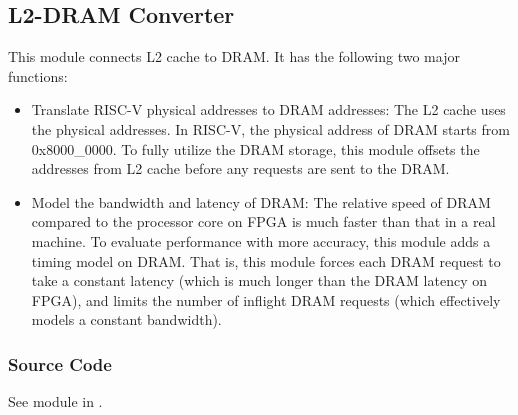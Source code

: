 \subsection{L2-DRAM Converter}

This module connects L2 cache to DRAM.
It has the following two major functions:
\begin{itemize}
    \item Translate RISC-V physical addresses to DRAM addresses:
    The L2 cache uses the physical addresses.
    In RISC-V, the physical address of DRAM starts from 0x8000\_0000.
    To fully utilize the DRAM storage, this module offsets the addresses from L2 cache before any requests are sent to the DRAM.
    
    \item Model the bandwidth and latency of DRAM:
    The relative speed of DRAM compared to the processor core on FPGA is much faster than that in a real machine.
    To evaluate performance with more accuracy, this module adds a timing model on DRAM.
    That is, this module forces each DRAM request to take a constant latency (which is much longer than the DRAM latency on FPGA), and limits the number of inflight DRAM requests (which effectively models a constant bandwidth).
\end{itemize}

\subsubsection{Source Code}
See module  in .
